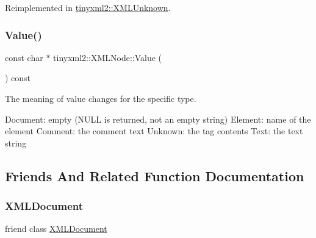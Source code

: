 Reimplemented in \mbox{\hyperlink{classtinyxml2_1_1_x_m_l_unknown_a61b342b4f295cded1dc2f4402e97f07e}{tinyxml2\+::\+X\+M\+L\+Unknown}}.

\mbox{\label{classtinyxml2_1_1_x_m_l_node_a0485e51c670e741884cfd8362274d680}} 
\subsubsection{\texorpdfstring{Value()}{Value()}}
{\footnotesize\ttfamily const char $\ast$ tinyxml2\+::\+X\+M\+L\+Node\+::\+Value (\begin{DoxyParamCaption}{ }\end{DoxyParamCaption}) const}

The meaning of \textquotesingle{}value\textquotesingle{} changes for the specific type. \begin{DoxyVerb}Document:   empty (NULL is returned, not an empty string)
Element:    name of the element
Comment:    the comment text
Unknown:    the tag contents
Text:       the text string
\end{DoxyVerb}
 

\subsection{Friends And Related Function Documentation}
\mbox{\label{classtinyxml2_1_1_x_m_l_node_a4eee3bda60c60a30e4e8cd4ea91c4c6e}} 
\subsubsection{\texorpdfstring{X\+M\+L\+Document}{XMLDocument}}
{\footnotesize\ttfamily friend class \mbox{\hyperlink{classtinyxml2_1_1_x_m_l_document}{X\+M\+L\+Document}}\hspace{0.3cm}{\ttfamily [friend]}}

\mbox{\label{classtinyxml2_1_1_x_m_l_node_ac2fba9b6e452829dd892f7392c24e0eb}} 
